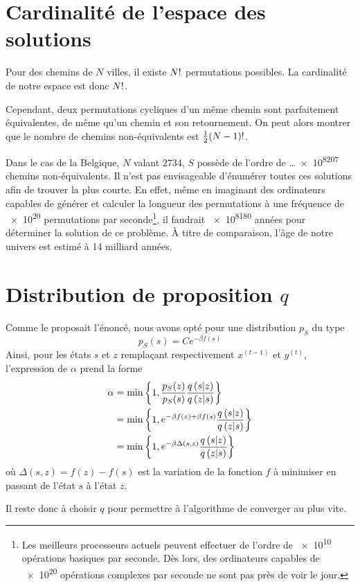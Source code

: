 \documentclass[a4paper, 12pt]{report}
\begin{document}
	\section{Cardinalité de l'espace des solutions}
	Pour des chemins de $N$ villes, il existe $N!$ permutations possibles. La cardinalité de notre espace est donc $N!$. \par
	Cependant, deux permutations cycliques d'un même chemin sont parfaitement équivalentes, de même qu'un chemin et son retournement. On peut alors montrer que le nombre de chemins non-équivalents est $\frac{1}{2} (N - 1)!$. \cite{wiki_tsp} \par
	Dans le cas de la Belgique, $N$ valant $\num{2734}$, $S$ possède de l'ordre de \ldots \num{e8207} chemins non-équivalents. Il n'est pas envisageable d'énumérer toutes ces solutions afin de trouver la plus courte. En effet, même en imaginant des ordinateurs capables de générer et calculer la longueur des permutations à une fréquence de \num{e20} permutations par seconde\footnote{Les meilleurs processeurs actuels peuvent effectuer de l'ordre de \num{e10} opérations basiques par seconde. Dès lors, des ordinateurs capables de \num{e20} opérations complexes par seconde ne sont pas près de voir le jour.}, il faudrait \num{e8180} années pour déterminer la solution de ce problème. À titre de comparaison, l'âge de notre univers est estimé à \num{14} milliard années.
	\section{Distribution de proposition $q$}
	Comme le proposait l'énoncé, nous avons opté pour une distribution $p_S$ du type
	\begin{equation*}
	    p_S(s) = Ce^{-\beta f(s)}
	\end{equation*}
	Ainsi, pour les états $s$ et $z$ remplaçant respectivement $x^{(t - 1)}$ et $y^{(t)}$, l'expression de $\alpha$ prend la forme
	\begin{align}
        \alpha & = \min \left\{1, \frac{p_{S}(z)}{p_{S}(s)} \frac{q \left(s | z\right)}{ q \left(z | s\right)}\right\} \nonumber \\
        & = \min \left\{1, e^{-\beta f(z) + \beta f(s)} \frac{q \left(s | z\right)}{ q \left(z | s\right)}\right\} \nonumber \\
        & = \min \left\{1, e^{-\beta \Delta(s, z)} \frac{q \left(s | z\right)}{ q \left(z | s\right)}\right\}
    \end{align}
    où $\Delta(s, z) = f(z) - f(s)$ est la variation de la fonction $f$ à minimiser en passant de l'état $s$ à l'état $z$. \par
    Il reste donc à choisir $q$ pour permettre à l'algorithme de converger au plus vite.
\end{document}
